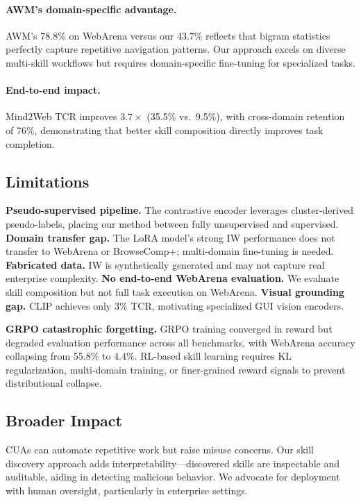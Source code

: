 \documentclass{article}
\begin{document}
\paragraph{AWM's domain-specific advantage.} AWM's 78.8\% on WebArena versus our 43.7\% reflects that bigram statistics perfectly capture repetitive navigation patterns. Our approach excels on diverse multi-skill workflows but requires domain-specific fine-tuning for specialized tasks.

\paragraph{End-to-end impact.} Mind2Web TCR improves $3.7\times$ (35.5\% vs.\ 9.5\%), with cross-domain retention of 76\%, demonstrating that better skill composition directly improves task completion.

\subsection{Limitations}

\textbf{Pseudo-supervised pipeline.} The contrastive encoder leverages cluster-derived pseudo-labels, placing our method between fully unsupervised and supervised.
\textbf{Domain transfer gap.} The LoRA model's strong IW performance does not transfer to WebArena or BrowseComp+; multi-domain fine-tuning is needed.
\textbf{Fabricated data.} IW is synthetically generated and may not capture real enterprise complexity.
\textbf{No end-to-end WebArena evaluation.} We evaluate skill composition but not full task execution on WebArena.
\textbf{Visual grounding gap.} CLIP achieves only 3\% TCR, motivating specialized GUI vision encoders.

\textbf{GRPO catastrophic forgetting.} GRPO training converged in reward but degraded evaluation performance across all benchmarks, with WebArena accuracy collapsing from 55.8\% to 4.4\%. RL-based skill learning requires KL regularization, multi-domain training, or finer-grained reward signals to prevent distributional collapse.

\subsection{Broader Impact}

CUAs can automate repetitive work but raise misuse concerns. Our skill discovery approach adds interpretability---discovered skills are inspectable and auditable, aiding in detecting malicious behavior. We advocate for deployment with human oversight, particularly in enterprise settings.
\end{document}
